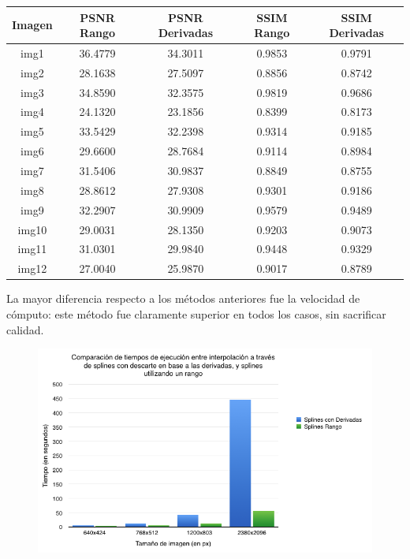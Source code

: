 \documentclass[a4paper]{article}
\begin{document}
\begin{center}
\begin{tabular}{  | c || c | c | c | c | }
 \hline
 Imagen & PSNR Rango & PSNR Derivadas & SSIM Rango & SSIM Derivadas\\
\hline
\hline
 img1 & 36.4779 & 34.3011 & 0.9853 & 0.9791\\
 \hline
 img2 & 28.1638 & 27.5097 & 0.8856 & 0.8742\\
 \hline  
  img3 & 34.8590 & 32.3575 & 0.9819 & 0.9686\\
 \hline  
  img4 & 24.1320 & 23.1856 & 0.8399 & 0.8173\\
 \hline  
  img5 & 33.5429 & 32.2398 & 0.9314 & 0.9185\\
 \hline  
  img6 & 29.6600 & 28.7684 & 0.9114 & 0.8984\\
 \hline  
  img7 & 31.5406 & 30.9837 & 0.8849 & 0.8755\\
 \hline  
  img8 & 28.8612 & 27.9308 & 0.9301 & 0.9186\\
 \hline  
  img9 & 32.2907 & 30.9909 & 0.9579 & 0.9489\\
 \hline  
  img10 & 29.0031 & 28.1350 & 0.9203 & 0.9073\\
 \hline  
  img11 & 31.0301 & 29.9840 & 0.9448 & 0.9329\\
 \hline  
  img12 & 27.0040 & 25.9870 & 0.9017 & 0.8789\\
 \hline  
\end{tabular}
\end{center}

\newpage

La mayor diferencia respecto a los métodos anteriores fue la velocidad de cómputo: este método fue claramente superior en todos los casos, sin sacrificar calidad.

\begin{figure}[h!]
    \begin{center}
    \includegraphics[scale=0.65]{imagenes/tiempos/derrangg.png}
    \label{tiemposrang}
  \end{center}
\end{figure}
\end{document}
